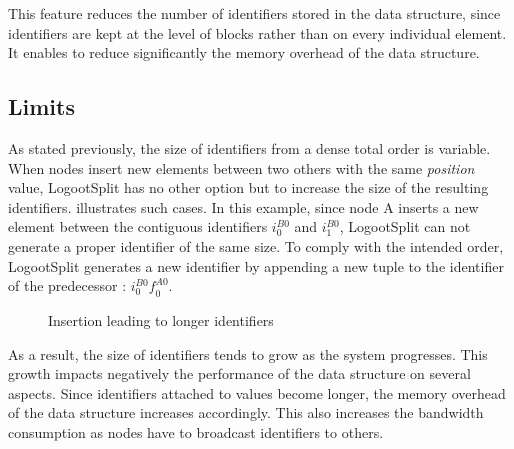 \documentclass[10pt,journal,compsoc]{IEEEtran}
\let\MYoriglatexcaption\caption
\renewcommand{\caption}[2][\relax]{\MYoriglatexcaption[#2]{#2}}
\newcommand{\trm}[1]{\mathit{#1}}
\newcommand{\id}[3]{$\trm{#1}^{\trm{#2}}_{\trm{#3}}$}
\newcommand{\widthletter}{2em}
\begin{document}
This feature reduces the number of identifiers stored in the data structure, since identifiers are kept at the level of blocks rather than on every individual element.
It enables to reduce significantly the memory overhead of the data structure.

\subsection{Limits}

As stated previously, the size of identifiers from a dense total order is variable.
When nodes insert new elements between two others with the same \emph{position} value, LogootSplit has no other option but to increase the size of the resulting identifiers.
 illustrates such cases.
In this example, since node A inserts a new element between the contiguous identifiers \id{i}{B0}{0} and \id{i}{B0}{1}, LogootSplit can not generate a proper identifier of the same size.
To comply with the intended order, LogootSplit generates a new identifier by appending a new tuple to the identifier of the predecessor : \id{i}{B0}{0}\id{f}{A0}{0}.

\begin{figure}[!ht]
    \centering
    \caption{Insertion leading to longer identifiers}
    \label{fig:example-split}
\end{figure}

As a result, the size of identifiers tends to grow as the system progresses.
This growth impacts negatively the performance of the data structure on several aspects.
Since identifiers attached to values become longer, the memory overhead of the data structure increases accordingly.
This also increases the bandwidth consumption as nodes have to broadcast identifiers to others.
\end{document}
